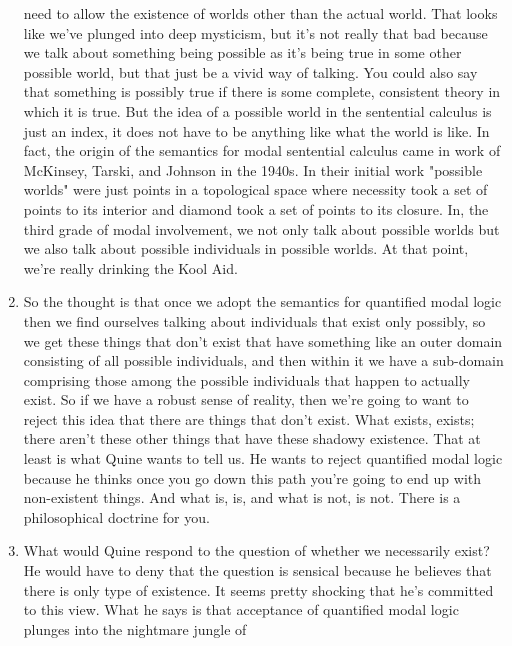 \documentclass[12pt]{article}
\theoremstyle{definition}
\begin{document}
\begin{enumerate}
        need to allow the existence of worlds other than the actual world. That
        looks like we've plunged into deep mysticism, but it's not really that
        bad because we talk about something being possible as it's being true
        in some other possible world, but that just be a vivid way of talking.
        You could also say that something is possibly true if there is some
        complete, consistent theory in which it is true. But the idea of a
        possible world in the sentential calculus is just an index, it does not
        have to be anything like what the world is like. In fact, the origin of
        the semantics for modal sentential calculus came in work of McKinsey,
        Tarski, and Johnson in the 1940s. In their initial work "possible
        worlds" were just points in a topological space where necessity took a
        set of points to its interior and diamond took a set of points to its
        closure. In, the third grade of modal involvement, we not only talk
        about possible worlds but we also talk about possible individuals in
        possible worlds. At that point, we're really drinking the Kool Aid.
    \item
        So the thought is that once we adopt the semantics for quantified modal
        logic then we find ourselves talking about individuals that exist only
        possibly, so we get these things that don't exist that have something
        like an outer domain consisting of all possible individuals, and then
        within it we have a sub-domain comprising those among the possible
        individuals that happen to actually exist. So if we have a robust sense
        of reality, then we're going to want to reject this idea that there are
        things that don't exist. What exists, exists; there aren't these other
        things that have these shadowy existence. That at least is what Quine
        wants to tell us. He wants to reject quantified modal logic because he
        thinks once you go down this path you're going to end up with
        non-existent things. And what is, is, and what is not, is not. There is
        a philosophical doctrine for you.
    \item
        What would Quine respond to the question of whether we necessarily
        exist? He would have to deny that the question is sensical because he
        believes that there is only type of existence. It seems pretty shocking
        that he's committed to this view. What he says is that acceptance of
        quantified modal logic plunges into the nightmare jungle of

\end{enumerate}
\end{document}
